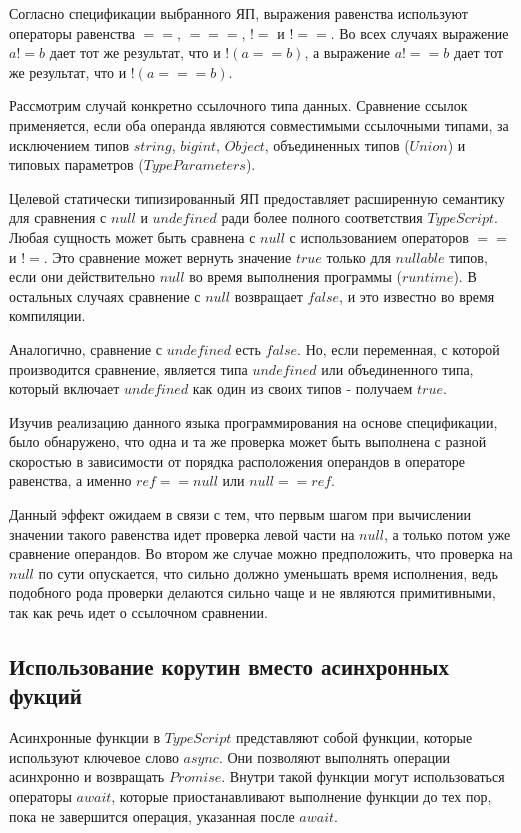 \documentclass{mipt-thesis-bs}
\begin{document}
Согласно спецификации выбранного ЯП, выражения равенства
используют операторы равенства $==$, $===$, $!=$ и $!==$.
Во всех случаях выражение $a != b$ дает тот же результат,
что и $!(a == b)$, а выражение $a !== b$ дает тот же результат, что и $!(a === b)$.

Рассмотрим случай конкретно ссылочного типа данных. Сравнение ссылок применяется,
если оба операнда являются совместимыми ссылочными типами,
за исключением типов $string$, $bigint$, $Object$, объединенных типов
($Union$) и типовых параметров ($Type Parameters$).

Целевой статически типизированный ЯП предоставляет
расширенную семантику для сравнения с $null$ и $undefined$
ради более полного соответствия $TypeScript$. Любая сущность может
быть сравнена с $null$ с использованием операторов $==$ и $!=$. Это
сравнение может вернуть значение $true$ только для $nullable$ типов,
если они действительно $null$ во время выполнения
программы ($runtime$). В остальных случаях сравнение с $null$ возвращает $false$,
и это известно во время компиляции.

Аналогично, сравнение с $undefined$ есть $false$. Но, если
переменная, с которой производится сравнение, является типа
$undefined$ или объединенного типа, который включает
$undefined$ как один из своих типов - получаем $true$.

Изучив реализацию данного языка программирования на основе
спецификации, было обнаружено,
что одна и та же проверка может быть выполнена с разной скоростью в
зависимости от порядка расположения операндов в операторе равенства, а
именно $ref == null$ или $null == ref$.

Данный эффект ожидаем в связи с тем, что первым шагом при вычислении
значении такого равенства идет проверка левой части на $null$, а
только потом уже сравнение операндов. Во втором же случае можно
предположить, что проверка на $null$ по сути опускается, что сильно
должно уменьшать время исполнения, ведь подобного рода проверки делаются
сильно чаще и не являются примитивными, так как речь идет о ссылочном
сравнении.

\subsection{Использование корутин вместо асинхронных фукций}

Асинхронные функции в $TypeScript$ представляют собой функции,
которые используют ключевое слово $async$. Они позволяют выполнять
операции асинхронно и возвращать $Promise$. Внутри такой функции
могут использоваться операторы $await$, которые приостанавливают
выполнение функции до тех пор, пока не завершится операция,
указанная после $await$.
\end{document}
